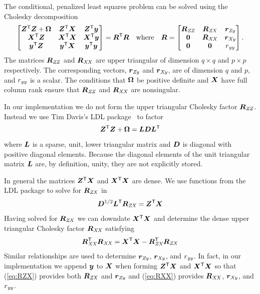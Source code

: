 \documentclass[12pt]{article}
\begin{document}
The conditional, penalized least squares problem can be solved using
the Cholesky decomposition
\begin{equation}
  \label{eq:CrossProdGen}
  \begin{bmatrix}
    \bm{Z}^\mathsf{T}\bm{Z}+\bm{\Omega} & \bm{Z}^\mathsf{T}\bm{X}  & \bm{Z}^\mathsf{T}\bm{y} \\
    \bm{X}^\mathsf{T}\bm{Z}         & \bm{X}^\mathsf{T}\bm{X}  & \bm{X}^\mathsf{T}\bm{y} \\
    \bm{y}^\mathsf{T}\bm{Z}         & \bm{y}^\mathsf{T}\bm{X}  & \bm{y}^\mathsf{T}\bm{y}
  \end{bmatrix}=\bm{R}^\mathsf{T}\bm{R}\quad\text{where}\quad\bm{R}=
  \begin{bmatrix}
    \bm{R}_\mathit{ZZ} & \bm{R}_\mathit{ZX} & \bm{r}_\mathit{Zy} \\
    \bm{0}    & \bm{R}_\mathit{XX} & \bm{r}_\mathit{Xy} \\
    \bm{0}    & \bm{0}    & r_\mathit{yy}
  \end{bmatrix} .
\end{equation}
The matrices $\bm{R}_\mathit{ZZ}$ and $\bm{R}_\mathit{XX}$ are upper triangular of dimension
$q\times q$ and $p\times p$ respectively.  The corresponding vectors,
$\bm{r}_\mathit{Zy}$ and $\bm{r}_\mathit{Xy}$, are of dimension $q$ and $p$, and $r_\mathit{yy}$ is a
scalar.  The conditions that $\bm{\Omega}$ be positive definite and $\bm{X}$
have full column rank ensure that $\bm{R}_\mathit{ZZ}$ and $\bm{R}_\mathit{XX}$ are nonsingular.

In our implementation we do not form the upper triangular Cholesky
factor $\bm{R}_\mathit{ZZ}$.  Instead we use Tim Davis's LDL
package~\citep{Davis:2004} to factor
\begin{equation}
  \label{eq:LDLfactor}
  \bm{Z}^\mathsf{T}\bm{Z}+\bm{\Omega}=\bm{L}\bm{D}\bm{L}^\mathsf{T}
\end{equation}
where $\bm{L}$ is a sparse, unit, lower triangular matrix and $\bm{D}$ is
diagonal with positive diagonal elements. Because the diagonal
elements of the unit triangular matrix $\bm{L}$ are, by definition,
unity, they are not explicitly stored.

In general the matrices $\bm{Z}^\mathsf{T}\bm{X}$ and $\bm{X}^\mathsf{T}\bm{X}$ are dense.
We use functions from the LDL package to solve for $\bm{R}_\mathit{ZX}$ in
\begin{equation}
  \label{eq:RZX}
  \bm{D}^{1/2}\bm{L}^\mathsf{T}\bm{R}_\mathit{ZX}=\bm{Z}^\mathsf{T}\bm{X}
\end{equation}
Having solved for $\bm{R}_\mathit{ZX}$ we can downdate $\bm{X}^\mathsf{T}\bm{X}$ and determine
the dense upper triangular Cholesky factor $\bm{R}_\mathit{XX}$ satisfying
\begin{equation}
  \label{eq:RXX}
  \bm{R}_\mathit{XX}^\mathsf{T}\bm{R}_\mathit{XX}=\bm{X}^\mathsf{T}\bm{X}-\bm{R}_\mathit{ZX}^\mathsf{T}\bm{R}_\mathit{ZX}
\end{equation}
Similar relationships are used to determine $\bm{r}_\mathit{Zy}$, $\bm{r}_\mathit{Xy}$, and
$r_\mathit{yy}$.  In fact, in our implementation we append $\bm{y}$ to $\bm{X}$ when
forming $\bm{Z}^\mathsf{T}\bm{X}$ and $\bm{X}^\mathsf{T}\bm{X}$ so that
(\ref{eq:RZX}) provides both $\bm{R}_\mathit{ZX}$ and $\bm{r}_\mathit{Zy}$ and
(\ref{eq:RXX}) provides $\bm{R}_\mathit{XX}$, $\bm{r}_\mathit{Xy}$, and $r_\mathit{yy}$.
\end{document}
